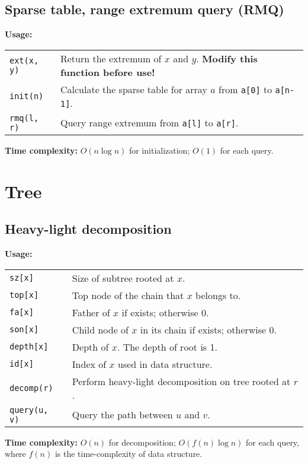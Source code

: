 \subsection{Sparse table, range extremum query (RMQ)}
\textbf{Usage:} \\[0.1cm]
\begin{tabular}{p{2cm} p{9.5cm}}
  \lstinline|ext(x, y)| & Return the extremum of $x$ and $y$. \textbf{Modify this function before use!} \\
  \lstinline|init(n)| & Calculate the sparse table for array $a$ from \lstinline|a[0]| to \lstinline|a[n-1]|. \\
  \lstinline|rmq(l, r)| & Query range extremum from \lstinline|a[l]| to \lstinline|a[r]|. \\
\end{tabular} \par
\textbf{Time complexity:} $O(n \log n)$ for initialization; $O(1)$ for each query. \par


\section{Tree}
\subsection{Heavy-light decomposition}
\textbf{Usage:} \\[0.1cm]
\begin{tabular}{p{2cm} p{9.5cm}}
  \lstinline|sz[x]| & Size of subtree rooted at $x$. \\
  \lstinline|top[x]| & Top node of the chain that $x$ belongs to. \\ \lstinline|fa[x]| & Father of $x$ if exists; otherwise 0. \\
  \lstinline|son[x]| & Child node of $x$ in its chain if exists; otherwise 0. \\
  \lstinline|depth[x]| & Depth of $x$. The depth of root is 1. \\
  \lstinline|id[x]| & Index of $x$ used in data structure. \\
  \lstinline|decomp(r)| & Perform heavy-light decomposition on tree rooted at $r$. \\
  \lstinline|query(u, v)| & Query the path between $u$ and $v$. \\
\end{tabular} \par
\textbf{Time complexity:} $O(n)$ for decomposition; $O(f(n)\log n)$ for each query, where $f(n)$ is the time-complexity of data structure. \par


